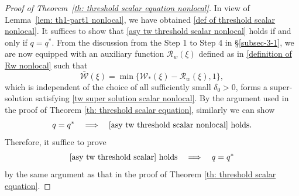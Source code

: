 \documentclass[11pt,a4paper]{article}
\numberwithin{equation}{section}
\numberwithin{figure}{section}
\newcommand\bea{\begin{eqnarray}}
\newcommand\eea{\end{eqnarray}}
\begin{document}
\begin{proof}[Proof of Theorem~\ref{th: threshold scalar equation nonlocal}]
In view of Lemma~\ref{lem: th1-part1 nonlocal}, we have obtained \eqref{def of threshold scalar nonlocal}.
It suffices to show that \eqref{asy tw threshold scalar nonlocal} holds if and only if $q=q^*$.
From the discussion from the Step 1 to Step 4 in \S \ref{subsec-3-1},
we are now equipped with an auxiliary function $\mathcal{R}_w(\xi)$ %
defined as in \eqref{definition of Rw nonlocal} such that 
$$\bar{\mathcal W} (\xi)=\min \{\mathcal{W}_*(\xi)-\mathcal{R}_w(\xi),1\},$$
 which is independent of the choice of all sufficiently small $\delta_0>0$, forms
a super-solution satisfying \eqref{tw super solution scalar nonlocal}. By the argument used in the proof of Theorem \ref{th: threshold scalar equation}, similarly we can show
\bea\label{th1:goal-1 nonlocal}
q=q^* \quad \Longrightarrow \quad \mbox{\eqref{asy tw threshold scalar nonlocal} holds}.
\eea
Therefore, it suffice to prove
\bea\label{th1:goal-2 nonlocal}
\mbox{\eqref{asy tw threshold scalar} holds} \quad \Longrightarrow \quad q=q^*
\eea
by the same argument as that in the proof of Theorem \ref{th: threshold scalar equation}.


\end{proof}
\end{document}
